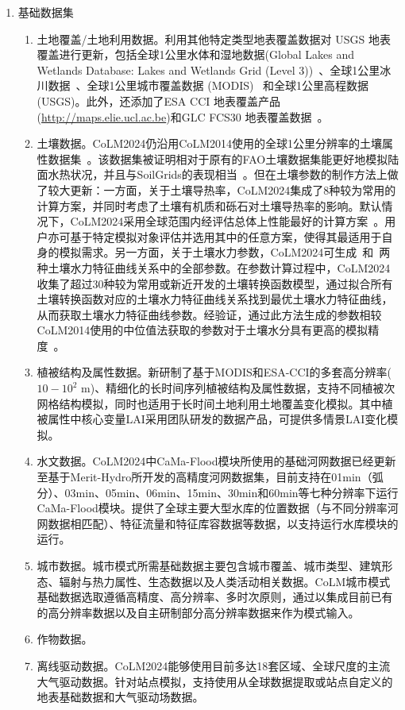 \begin{enumerate}[label={\arabic*)}]
    \item 基础数据集
    \begin{enumerate}[label={\alph*)}]
        \item 土地覆盖/土地利用数据。利用其他特定类型地表覆盖数据对 USGS 地表覆盖进行更新，包括全球1公里水体和湿地数据(Global Lakes and Wetlands Database: Lakes and Wetlands Grid (Level 3))~\citep{lehner2004development}、全球1公里冰川数据~\citep{RGIConsortium2017}、全球1公里城市覆盖数据 (MODIS)~\citep{schneider2009new} 和全球1公里高程数据(USGS)。此外，还添加了ESA CCI 地表覆盖产品(\url{http://maps.elie.ucl.ac.be})和GLC FCS30 地表覆盖数据~\citep{zhang2023glc_fcs30d}。
        \item 土壤数据。CoLM2024仍沿用CoLM2014使用的全球1公里分辨率的土壤属性数据集~\citep{shangguan2014global}。该数据集被证明相对于原有的FAO土壤数据集能更好地模拟陆面水热状况，并且与SoilGrids的表现相当~\citep{李文耀2020土壤}。但在土壤参数的制作方法上做了较大更新：一方面，关于土壤导热率，CoLM2024集成了8种较为常用的计算方案，并同时考虑了土壤有机质和砾石对土壤导热率的影响。默认情况下，CoLM2024采用全球范围内经评估总体上性能最好的计算方案~\citep{dai2019evaluation, balland2005}。用户亦可基于特定模拟对象评估并选用其中的任意方案，使得其最适用于自身的模拟需求。另一方面，关于土壤水力参数，CoLM2024可生成~\citet{campbell1974}和~\citet{van1980closed}两种土壤水力特征曲线关系中的全部参数。在参数计算过程中，CoLM2024收集了超过30种较为常用或新近开发的土壤转换函数模型，通过拟合所有土壤转换函数对应的土壤水力特征曲线关系找到最优土壤水力特征曲线，从而获取土壤水力特征曲线参数。经验证，通过此方法生成的参数相较CoLM2014使用的中位值法获取的参数对于土壤水分具有更高的模拟精度~\citep{dai2019parameters}。
        \item 植被结构及属性数据。新研制了基于MODIS和ESA-CCI的多套高分辨率($10-10^2$ m)、精细化的长时间序列植被结构及属性数据，支持不同植被次网格结构模拟，同时也适用于长时间土地利用土地覆盖变化模拟。其中植被属性中核心变量LAI采用团队研发的数据产品\citep{yuan2011reprocessing,lin2023ReprocessedMODISVersion}，可提供多情景LAI变化模拟。
        \item 水文数据。CoLM2024中CaMa-Flood模块所使用的基础河网数据已经更新至基于Merit-Hydro所开发的高精度河网数据集，目前支持在01min（弧分）、03min、05min、06min、15min、30min和60min等七种分辨率下运行CaMa-Flood模块。提供了全球主要大型水库的位置数据（与不同分辨率河网数据相匹配）、特征流量和特征库容数据等数据，以支持运行水库模块的运行。
        \item 城市数据。城市模式所需基础数据主要包含城市覆盖、城市类型、建筑形态、辐射与热力属性、生态数据以及人类活动相关数据。CoLM城市模式基础数据选取遵循高精度、高分辨率、多时次原则，通过以集成目前已有的高分辨率数据以及自主研制部分高分辨率数据来作为模式输入。
        \item 作物数据。
        \item 离线驱动数据。CoLM2024能够使用目前多达18套区域、全球尺度的主流大气驱动数据。针对站点模拟，支持使用从全球数据提取或站点自定义的地表基础数据和大气驱动场数据。
    \end{enumerate}
    

\end{enumerate}
